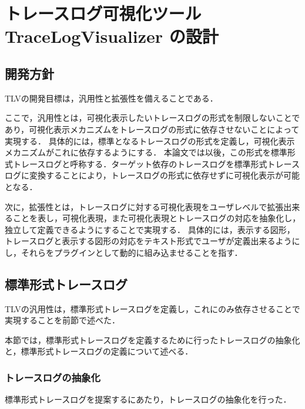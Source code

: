 \chapter{トレースログ可視化ツール TraceLogVisualizer の設計}

\section{開発方針}
TLVの開発目標は，汎用性と拡張性を備えることである．

ここで，汎用性とは，可視化表示したいトレースログの形式を制限しないことであり，可視化表示メカニズムをトレースログの形式に依存させないことによって実現する．
具体的には，標準となるトレースログの形式を定義し，可視化表示メカニズムがこれに依存するようにする．
本論文では以後，この形式を標準形式トレースログと呼称する．ターゲット依存のトレースログを標準形式トレースログに変換することにより，トレースログの形式に依存せずに可視化表示が可能となる．

次に，拡張性とは，トレースログに対する可視化表現をユーザレベルで拡張出来ることを表し，可視化表現，また可視化表現とトレースログの対応を抽象化し，独立して定義できるようにすることで実現する．
具体的には，表示する図形，トレースログと表示する図形の対応をテキスト形式でユーザが定義出来るようにし，それらをプラグインとして動的に組み込ませることを指す．

\section{標準形式トレースログ}

TLVの汎用性は，標準形式トレースログを定義し，これにのみ依存させることで実現することを前節で述べた．

本節では，標準形式トレースログを定義するために行ったトレースログの抽象化と，標準形式トレースログの定義について述べる．

\subsection{トレースログの抽象化}

標準形式トレースログを提案するにあたり，トレースログの抽象化を行った．


